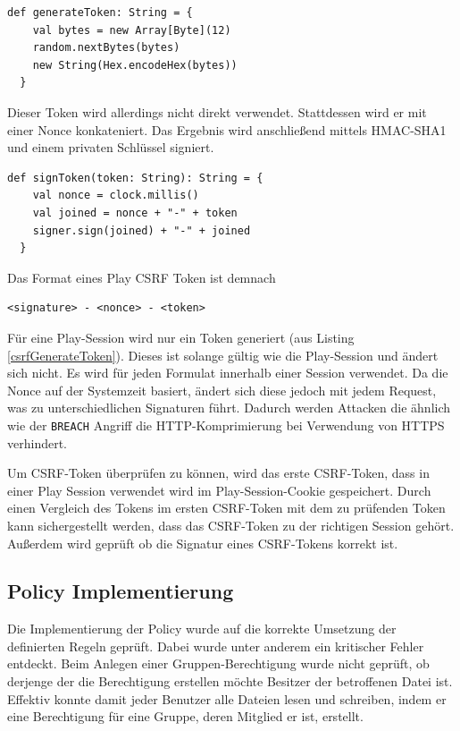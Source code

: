 \documentclass[12pt,DIV14,BCOR10mm,a4paper,parskip=half-,headsepline,headinclude,english,ngerman,bibliography=totocnumbered]{scrreprt}
\begin{document}
\begin{lstlisting}[label=csrfGenerateToken, caption={Methode zum Generieren von Tokens. Aus DefaultCSRFTokenSigner, Play 2.6.20},captionpos=b]
  def generateToken: String = {
    val bytes = new Array[Byte](12)
    random.nextBytes(bytes)
    new String(Hex.encodeHex(bytes))
  }
\end{lstlisting}
Dieser Token wird allerdings nicht direkt verwendet. Stattdessen wird er mit einer Nonce konkateniert. Das Ergebnis wird anschließend mittels HMAC-SHA1 und einem privaten Schlüssel signiert.

\begin{lstlisting}[label=csrfSignToken, caption={Methode zum Signieren von Token. Aus DefaultCSRFTokenSigner, Play 2.6.20},captionpos=b]
  def signToken(token: String): String = {
    val nonce = clock.millis()
    val joined = nonce + "-" + token
    signer.sign(joined) + "-" + joined
  }
\end{lstlisting}

Das Format eines Play CSRF Token ist demnach
\begin{lstlisting}
<signature> - <nonce> - <token>
\end{lstlisting}

Für eine Play-Session wird nur ein Token generiert (aus Listing \ref{csrfGenerateToken}). Dieses ist solange gültig wie die Play-Session und ändert sich nicht. Es wird für jeden Formulat innerhalb einer Session verwendet. Da die Nonce auf der Systemzeit basiert, ändert sich diese jedoch mit jedem Request, was zu unterschiedlichen Signaturen führt. Dadurch werden Attacken die ähnlich wie der \texttt{BREACH} Angriff die HTTP-Komprimierung bei Verwendung von HTTPS verhindert.

Um CSRF-Token überprüfen zu können, wird das erste CSRF-Token, dass in einer Play Session verwendet wird im Play-Session-Cookie gespeichert. Durch einen Vergleich des Tokens im ersten CSRF-Token mit dem zu prüfenden Token kann sichergestellt werden, dass das CSRF-Token zu der richtigen Session gehört. Außerdem wird geprüft ob die Signatur eines CSRF-Tokens korrekt ist.


\subsection{Policy Implementierung}
Die Implementierung der Policy wurde auf die korrekte Umsetzung der definierten Regeln geprüft. Dabei wurde unter anderem ein kritischer Fehler entdeckt. Beim Anlegen einer Gruppen-Berechtigung wurde nicht geprüft, ob derjenge der die Berechtigung erstellen möchte Besitzer der betroffenen Datei ist. Effektiv konnte damit jeder Benutzer alle Dateien lesen und schreiben, indem er eine Berechtigung für eine Gruppe, deren Mitglied er ist, erstellt.
\end{document}
